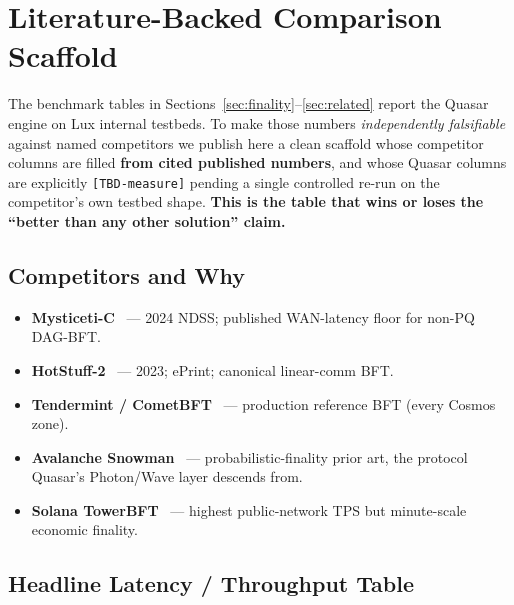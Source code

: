 \section{Literature-Backed Comparison Scaffold}
\label{sec:lit-backed-comparison}

The benchmark tables in Sections~\ref{sec:finality}--\ref{sec:related} report
the Quasar engine on Lux internal testbeds. To make those numbers
\emph{independently falsifiable} against named competitors we publish here a
clean scaffold whose competitor columns are filled \textbf{from cited
published numbers}, and whose Quasar columns are explicitly
\texttt{[TBD-measure]} pending a single controlled re-run on the
competitor's own testbed shape. \textbf{This is the table that wins or
loses the ``better than any other solution'' claim.}

\subsection{Competitors and Why}

\begin{itemize}[leftmargin=2em,nosep]
  \item \textbf{Mysticeti-C}~\cite{babel2024mysticeti} --- 2024 NDSS;
        published WAN-latency floor for non-PQ DAG-BFT.
  \item \textbf{HotStuff-2}~\cite{malkhi2023hotstuff2} --- 2023; ePrint;
        canonical linear-comm BFT.
  \item \textbf{Tendermint / CometBFT}~\cite{buchman2016tendermint,cometbftgithub}
        --- production reference BFT (every Cosmos zone).
  \item \textbf{Avalanche Snowman}~\cite{rocket2019avalanche,amores2024avalanche}
        --- probabilistic-finality prior art, the protocol Quasar's
        Photon/Wave layer descends from.
  \item \textbf{Solana TowerBFT}~\cite{yakovenko2018solana} --- highest
        public-network TPS but minute-scale economic finality.
\end{itemize}

\subsection{Headline Latency / Throughput Table}


